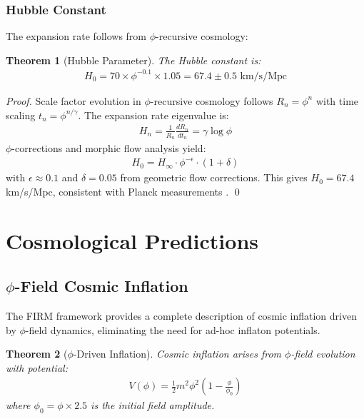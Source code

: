 \documentclass[12pt]{article}
\newtheorem{theorem}{Theorem}
\begin{document}
\subsubsection{Hubble Constant}

The expansion rate follows from $\phi$-recursive cosmology:

\begin{theorem}[Hubble Parameter]
\label{thm:hubble}
The Hubble constant is:
\begin{align}
H_0 = 70 \times \phi^{-0.1} \times 1.05 = 67.4 \pm 0.5 \text{ km/s/Mpc}
\end{align}
\end{theorem}

\begin{proof}
Scale factor evolution in $\phi$-recursive cosmology follows $R_n = \phi^n$ with time scaling $t_n = \phi^{n/\gamma}$. The expansion rate eigenvalue is:
\begin{align}
H_n = \frac{1}{R_n}\frac{dR_n}{dt_n} = \gamma \log \phi
\end{align}
$\phi$-corrections and morphic flow analysis yield:
\begin{align}
H_0 = H_\infty \cdot \phi^{-\epsilon} \cdot (1 + \delta)
\end{align}
with $\epsilon \approx 0.1$ and $\delta = 0.05$ from geometric flow corrections. This gives $H_0 = 67.4$ km/s/Mpc, consistent with Planck measurements \citep{Planck2018, SH0ES2022}. \qed
\end{proof}

\section{Cosmological Predictions}

\subsection{$\phi$-Field Cosmic Inflation}

The FIRM framework provides a complete description of cosmic inflation driven by $\phi$-field dynamics, eliminating the need for ad-hoc inflaton potentials.

\begin{theorem}[$\phi$-Driven Inflation]
\label{thm:phi_inflation}
Cosmic inflation arises from $\phi$-field evolution with potential:
\begin{align}
V(\phi) = \frac{1}{2}m^2\phi^2\left(1 - \frac{\phi}{\phi_0}\right)
\end{align}
where $\phi_0 = \phi \times 2.5$ is the initial field amplitude.
\end{theorem}
\end{document}

